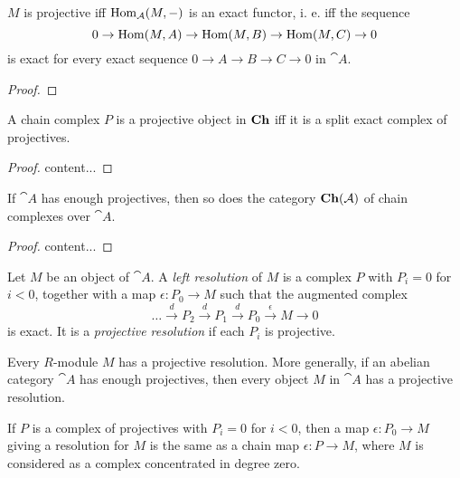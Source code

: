 \begin{lemma}
	$M$ is projective iff $\operatorname{Hom}_{\mathcal{A}}(M,-)$ is an exact functor, i. e. iff the sequence 
	$$0 \rightarrow \operatorname{Hom}(M,A) \rightarrow \operatorname{Hom}(M,B) \rightarrow \operatorname{Hom}(M,C) \rightarrow 0$$
	is exact for every exact sequence $0\rightarrow A \rightarrow B \rightarrow C \rightarrow 0$ in $\cat{A}$.
\end{lemma}

\begin{proof}
	
\end{proof}

\begin{exercise}
	A chain complex $P$ is a projective object in $\textrm{\textup{\textbf{Ch}}}$ iff it is a split exact complex of projectives.
\end{exercise}

\begin{proof}
	content...
\end{proof}

\begin{exercise}
	If $\cat{A}$ has enough projectives, then so does the category $\textrm{\textup{\textbf{Ch}}}(\mathcal{A})$ of chain complexes over $\cat{A}$.
\end{exercise}

\begin{proof}
	content...
\end{proof}

\begin{definition}
	Let $M$ be an object of $\cat{A}$. A \textit{left resolution} of $M$ is a complex $P$ with $P_i=0$ for $i<0$, together with a map $\epsilon:P_0\rightarrow M$ such that the augmented complex
	$$\dots \overset{d}{\longrightarrow} P_2 \overset{d}{\longrightarrow} P_1 \overset{d}{\longrightarrow} P_0 \overset{\epsilon}{\longrightarrow} M \longrightarrow 0$$
	is exact. It is a \textit{projective resolution} if each $P_i$ is projective.
\end{definition}

\begin{lemma}
	Every $R$-module $M$ has a projective resolution. More generally, if an abelian category $\cat{A}$ has enough projectives, then every object $M$ in $\cat{A}$ has a projective resolution.
\end{lemma}

\begin{exercise}
	If $P$ is a complex of projectives with $P_i=0$ for $i<0$, then a map $\epsilon:P_0\rightarrow M$ giving a resolution for $M$ is the same as a chain map $\epsilon:P\rightarrow M$, where $M$ is considered as a complex concentrated in degree zero.
\end{exercise}

